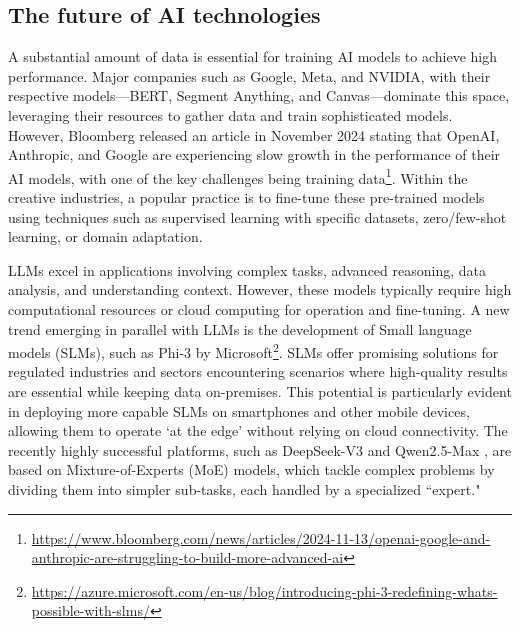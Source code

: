 \documentclass[11pt,a4paper]{article}
\begin{document}
\subsection{The future of AI technologies}

A substantial amount of data is essential for training AI models to achieve high performance. Major companies such as Google, Meta, and NVIDIA, with their respective models—BERT, Segment Anything, and Canvas—dominate this space, leveraging their resources to gather data and train sophisticated models. However, Bloomberg released an article in November 2024 stating that OpenAI, Anthropic, and Google are experiencing slow growth in the performance of their AI models, with one of the key challenges being training data\footnote{\url{https://www.bloomberg.com/news/articles/2024-11-13/openai-google-and-anthropic-are-struggling-to-build-more-advanced-ai}}.
Within the creative industries, a popular practice is to fine-tune these pre-trained models using techniques such as supervised learning with specific datasets, zero/few-shot learning, or domain adaptation.

LLMs excel in applications involving complex tasks, advanced reasoning, data analysis, and understanding context. 
However, these models typically require high computational resources or cloud computing for operation and fine-tuning. A new trend emerging in parallel with LLMs is the development of Small language models (SLMs), such as Phi-3 by Microsoft\footnote{\url{https://azure.microsoft.com/en-us/blog/introducing-phi-3-redefining-whats-possible-with-slms/}}. SLMs offer promising solutions for regulated industries and sectors encountering scenarios where high-quality results are essential while keeping data on-premises. This potential is particularly evident in deploying more capable SLMs on smartphones and other mobile devices, allowing them to operate `at the edge' without relying on cloud connectivity. The recently highly successful platforms, such as  DeepSeek-V3 \cite{deepseekv3} and Qwen2.5-Max \cite{qwen25}, are based on Mixture-of-Experts (MoE) models, which tackle complex problems by dividing them into simpler sub-tasks, each handled by a specialized ``expert."
\end{document}
